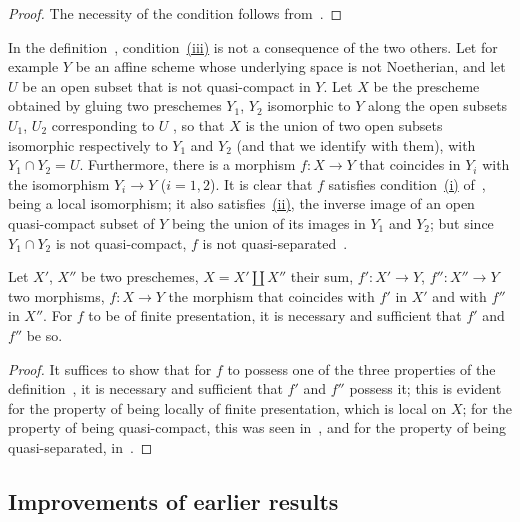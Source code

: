 \begin{proof}
The necessity of the condition follows from~.
\end{proof}

\begin{remark}[1.6.4]
\label{IV.1.6.4}
In the definition~, condition~\hyperref[IV.1.6.1]{(iii)} is not a consequence of the two others.
Let for example $Y$ be an affine scheme whose underlying space is not Noetherian, and let $U$ be an open subset that is not quasi-compact in $Y$.
Let $X$ be the prescheme obtained by gluing two preschemes $Y_1$, $Y_2$ isomorphic to $Y$ along the open subsets $U_1$, $U_2$ corresponding to $U$ , so that $X$ is the union of two open subsets isomorphic respectively to $Y_1$ and $Y_2$ (and that we identify with them), with $Y_1\cap Y_2=U$.
Furthermore, there is a morphism $f:X\to Y$ that coincides in $Y_i$ with the isomorphism $Y_i\to Y$ ($i=1,2$).
It is clear that $f$ satisfies condition~\hyperref[IV.1.6.1]{(i)} of~, being a local isomorphism; it also satisfies~\hyperref[IV.1.6.1]{(ii)}, the inverse image of an open quasi-compact subset of $Y$ being the union of its images in $Y_1$ and $Y_2$; but since $Y_1\cap Y_2$ is not quasi-compact, $f$ is not quasi-separated~.
\end{remark}

\begin{proposition}[1.6.5]
\label{IV.1.6.5}
Let $X'$, $X''$ be two preschemes, $X=X'\amalg X''$ their sum, $f':X'\to Y$, $f'':X''\to Y$ two morphisms, $f:X\to Y$ the morphism that coincides with $f'$ in $X'$ and with $f''$ in $X''$.
For $f$ to be of finite presentation, it is necessary and sufficient that $f'$ and $f''$ be so.
\end{proposition}

\begin{proof}
It suffices to show that for $f$ to possess one of the three properties of the definition~,
it is necessary and sufficient that $f'$ and $f''$ possess it; this is evident for the property of being locally of finite presentation, which is local on $X$; for the property of being quasi-compact, this was seen in~, and for the property of being quasi-separated, in~.
\end{proof}

\subsection{Improvements of earlier results}
\label{subsection:IV.1.7}

